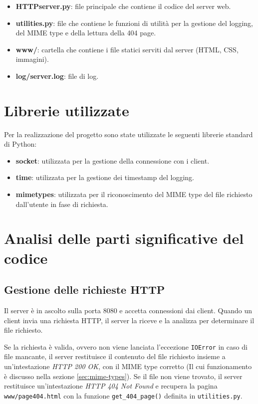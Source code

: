 \documentclass[a4paper,12pt]{report}
\begin{document}
\begin{itemize}
  \item \textbf{HTTPserver.py}: file principale che contiene il codice del server web.
  \item \textbf{utilities.py}: file che contiene le funzioni di utilità per la gestione del logging, del MIME type e della lettura della 404 page.
  \item \textbf{www/}: cartella che contiene i file statici serviti dal server (HTML, CSS, immagini).
  \item \textbf{log/server.log}: file di log.
\end{itemize}

\section{Librerie utilizzate}
Per la realizzazione del progetto sono state utilizzate le seguenti librerie standard di Python:
\begin{itemize}
    \item \textbf{socket}: utilizzata per la gestione della connessione con i client.
    \item \textbf{time}: utilizzata per la gestione dei timestamp del logging.
    \item \textbf{mimetypes}: utilizzata per il riconoscimento del MIME type del file richiesto dall'utente in fase di richiesta.
\end{itemize}

\section{Analisi delle parti significative del codice}
\subsection{Gestione delle richieste HTTP}
\label{sec:gestione-richieste-http}
Il server è in ascolto sulla porta 8080 e accetta connessioni dai client. Quando un client invia una richiesta HTTP, il server la riceve e la analizza per determinare il file richiesto.

Se la richiesta è valida, ovvero non viene lanciata l'eccezione \texttt{IOError} in caso di file mancante, il server restituisce il contenuto del file richiesto insieme a un'intestazione \textit{HTTP 200 OK}, con il MIME type corretto (Il cui funzionamento è discusso nella sezione \ref{sec:mime-types}). Se il file non viene trovato, il server restituisce un'intestazione \textit{HTTP 404 Not Found} e recupera la pagina \texttt{www/page404.html} con la funzione \texttt{get\_404\_page()} definita in \texttt{utilities.py}.
\end{document}
